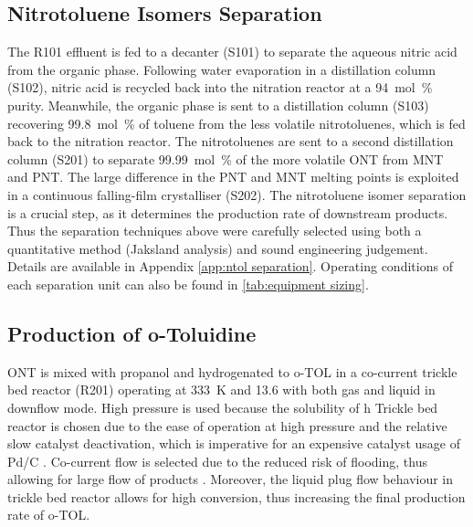 
\subsection{Nitrotoluene Isomers Separation}
The R101 effluent is fed to a decanter (S101) to separate the aqueous nitric acid from the organic phase. Following water evaporation in a distillation column (S102), nitric acid is recycled back into the nitration reactor at a \SI{94}{mol\percent} purity.
Meanwhile, the organic phase is sent to a distillation column (S103) recovering \SI{99.8}{mol\percent} of toluene from the less volatile nitrotoluenes, which is fed back to the nitration reactor. The nitrotoluenes are sent to a second distillation column (S201) to separate \SI{99.99}{mol\percent} of the more volatile ONT from MNT and PNT. The large difference in the PNT and MNT melting points is exploited in a continuous falling-film crystalliser (S202). 
The nitrotoluene isomer separation is a crucial step, as it determines the production rate of downstream products. Thus the separation techniques above were carefully selected using both a quantitative method (Jaksland analysis) \cite{jaksland_separation_1995} and sound engineering judgement. Details are available in Appendix \ref{app:ntol separation}. Operating conditions of each separation unit can also be found in \cref{tab:equipment sizing}. 

\subsection{Production of o-Toluidine}
ONT is mixed with propanol and hydrogenated to o-TOL in a co-current trickle bed reactor (R201) operating at \SI{333}{\K} and \SI{13.6}{\atm} with both gas and liquid in downflow mode. High pressure is used because the solubility of h Trickle bed reactor is chosen due to the ease of operation at high pressure and the relative slow catalyst deactivation, which is imperative for an expensive catalyst usage of Pd/C \cite{vemala_hydrodynamic_nodate}. Co-current flow is selected due to the reduced risk of flooding, thus allowing for large flow of products \cite{vemala_hydrodynamic_nodate}. Moreover, the liquid plug flow behaviour in trickle bed reactor allows for high conversion, thus increasing the final production rate of o-TOL. 

